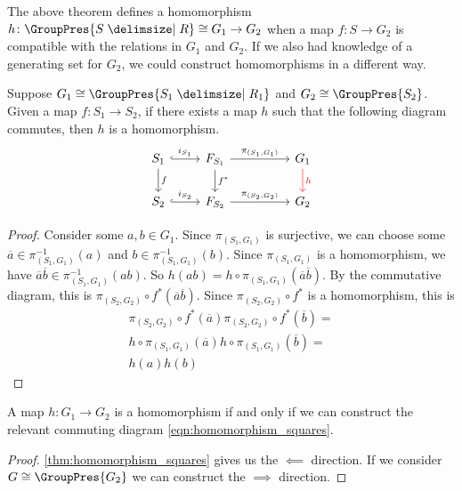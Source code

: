 The above theorem defines a homomorphism $h \colon \GroupPres{S \relations R} \cong G_1 \to G_2$ when a map $f \colon S \to G_2$ is compatible with the relations in $G_1$ and $G_2$.
If we also had knowledge of a generating set for $G_2$, we could construct homomorphisms in a different way.
\begin{theorem}
Suppose $G_1 \cong \GroupPres{S_1 \relations R_1}$ and $G_2 \cong \GroupPres{S_2}$.
Given a map $f \colon S_1 \to S_2$, if there exists a map  $h$ such that the following diagram commutes, then $h$ is a homomorphism.
\begin{equation}
\begin{tikzcd}
	S_1 \ar[d, "f"] \ar[r, hook, "i_{S_1}"] & F_{S_1} \ar[d, "f^*"] \ar[rr, "\pi_{(S_1, G_1)}"] & & \ar[d, color=red, "h"] G_1 \\
	S_2 \ar[r, hook, "i_{S_2}"] & F_{S_2} \ar[rr, "\pi_{(S_2, G_2)}"] & & G_2
\end{tikzcd}
\label{eqn:homomorphism_squares}
\end{equation}
	\label{thm:homomorphism_squares}
\end{theorem}
\begin{proof}
	Consider some $a,b \in G_1$. Since $\pi_{(S_1,G_1)}$ is surjective, we can choose some $\overline{a} \in \pi_{(S_1,G_1)}^{-1}(a)$ and $b \in \pi_{(S_1,G_1)}^{-1}(b)$.
	Since $\pi_{(S_1,G_1)}$ is a homomorphism, we have $\overline{a}\overline{b} \in \pi_{(S_1,G_1)}^{-1}(ab)$. So $h(ab) = h \circ \pi_{(S_1,G_1)}(\overline{a}\overline{b})$.
	By the commutative diagram, this is $\pi_{(S_2,G_2)} \circ f^* (\overline{a}\overline{b})$.
	Since $\pi_{(S_2,G_2)} \circ f^*$ is a homomorphism, this is
	\begin{align*}
		\pi_{(S_2,G_2)} \circ f^*\left(\overline{a}\right)\pi_{(S_2,G_2)} \circ f^*\left(\overline{b}\right) = 
		\\ h \circ \pi_{(S_1,G_1)}\left( \overline{a} \right) h \circ \pi_{(S_1,G_1)}\left( \overline{b} \right) =
		\\ h(a)h(b)
	\end{align*}
\end{proof}

\begin{corollary}
	A map $h \colon G_1 \to G_2$ is a homomorphism if and only if we can construct the relevant commuting diagram \eqref{eqn:homomorphism_squares}.
\end{corollary}
\begin{proof}
	\cref{thm:homomorphism_squares} gives us the $\impliedby$ direction. If we consider $G \cong \GroupPres{G_2}$ we can construct the  $\implies$ direction.
\end{proof}


